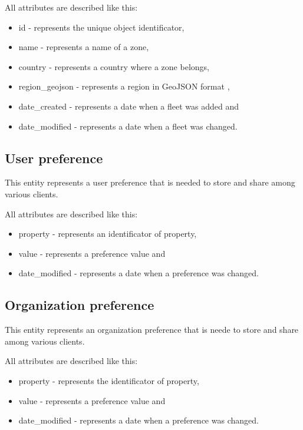 All attributes are described like this:
\begin{itemize}
    \item id - represents the unique object identificator,
    \item name - represents a name of a zone,
    \item country - represents a country where a zone belongs,
    \item region\_geojson - represents a region in GeoJSON format \cite{geoJson},
    \item date\_created - represents a date when a fleet was added and
    \item date\_modified - represents a date when a fleet was changed.
\end{itemize}

\subsection{User preference}\label{subsec:user-preference}
This entity represents a user preference that is needed to store and share among various clients.

All attributes are described like this:
\begin{itemize}
    \item property - represents an identificator of property,
    \item value - represents a preference value and
    \item date\_modified - represents a date when a preference was changed.
\end{itemize}

\subsection{Organization preference}\label{subsec:organization-preference}
This entity represents an organization preference that is neede to store and share among various clients.

All attributes are described like this:
\begin{itemize}
    \item property - represents the identificator of property,
    \item value - represents a preference value and
    \item date\_modified - represents a date when a preference was changed.
\end{itemize}

